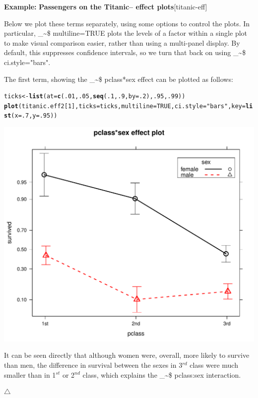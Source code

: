 \documentclass{article}
\makeatletter
\newcommand{\hlnum}[1]{\textcolor[rgb]{0.686,0.059,0.569}{#1}}%
\newcommand{\hlstr}[1]{\textcolor[rgb]{0.192,0.494,0.8}{#1}}%
\newcommand{\hlstd}[1]{\textcolor[rgb]{0.345,0.345,0.345}{#1}}%
\newcommand{\hlkwb}[1]{\textcolor[rgb]{0.69,0.353,0.396}{#1}}%
\newcommand{\hlkwc}[1]{\textcolor[rgb]{0.333,0.667,0.333}{#1}}%
\newcommand{\hlkwd}[1]{\textcolor[rgb]{0.737,0.353,0.396}{\textbf{#1}}}%
\newenvironment{kframe}{%
 \def\at@end@of@kframe{}%
 \ifinner\ifhmode%
  \def\at@end@of@kframe{\end{minipage}}%
  \begin{minipage}{\columnwidth}%
 \fi\fi%
 \def\FrameCommand##1{\hskip\@totalleftmargin \hskip-\fboxsep
 \colorbox{shadecolor}{##1}\hskip-\fboxsep
     \hskip-\linewidth \hskip-\@totalleftmargin \hskip\columnwidth}%
 \MakeFramed {\advance\hsize-\width
   \@totalleftmargin\z@ \linewidth\hsize
   \@setminipage}}%
 {\par\unskip\endMakeFramed%
 \at@end@of@kframe}
\newenvironment{knitrout}{}{} %
\newcommand\code{\bgroup\@makeother\_\@makeother\~\@makeother\$\@codex}
\def\@codex#1{{\normalfont\ttfamily\hyphenchar\font=-1 #1}\egroup}
\newenvironment{Example}[2][unnamed-example]%
  {\medskip\noindent\textbf{\textsf{Example:}}
   \textbf{#2}\hfill [#1]\par\smallskip
  }
  {\hfill $\triangle$}
\makeatother
\begin{document}
\begin{Example}[titanic-eff]{Passengers on the Titanic-- effect plots}
Below we plot these terms separately, using some options to control the plots.
In particular, \code{multiline=TRUE} plots the levels of a factor within a
single plot to make visual comparison easier, rather than using a multi-panel display.
By default, this suppresses confidence intervals, so we turn that back on
using \code{ci.style="bars"}.

The first term, showing the \code{pclass*sex} effect can be plotted as follows:
\begin{knitrout}
\color{fgcolor}\begin{kframe}
\begin{alltt}
\hlstd{ticks} \hlkwb{<-} \hlkwd{list}\hlstd{(}\hlkwc{at}\hlstd{=}\hlkwd{c}\hlstd{(}\hlnum{.01}\hlstd{,} \hlnum{.05}\hlstd{,} \hlkwd{seq}\hlstd{(}\hlnum{.1}\hlstd{,} \hlnum{.9}\hlstd{,} \hlkwc{by}\hlstd{=}\hlnum{.2}\hlstd{),} \hlnum{.95}\hlstd{,} \hlnum{.99}\hlstd{))}
\hlkwd{plot}\hlstd{(titanic.eff2[}\hlnum{1}\hlstd{],} \hlkwc{ticks}\hlstd{=ticks,} \hlkwc{multiline}\hlstd{=}\hlnum{TRUE}\hlstd{,} \hlkwc{ci.style}\hlstd{=}\hlstr{"bars"}\hlstd{,} \hlkwc{key}\hlstd{=}\hlkwd{list}\hlstd{(}\hlkwc{x}\hlstd{=}\hlnum{.7}\hlstd{,} \hlkwc{y}\hlstd{=}\hlnum{.95}\hlstd{))}
\end{alltt}
\end{kframe}

{\centering \includegraphics[width=.5\linewidth]{figure/titanic-eff2-1} 

}



\end{knitrout}

It can be seen directly that although women were, overall, more likely to survive than
men, the difference in survival between the sexes in 3$^{rd}$ class were much smaller
than in 1$^{st}$ or 2$^{nd}$ class, which explains the \code{pclass:sex} interaction.


\end{Example}
\end{document}
